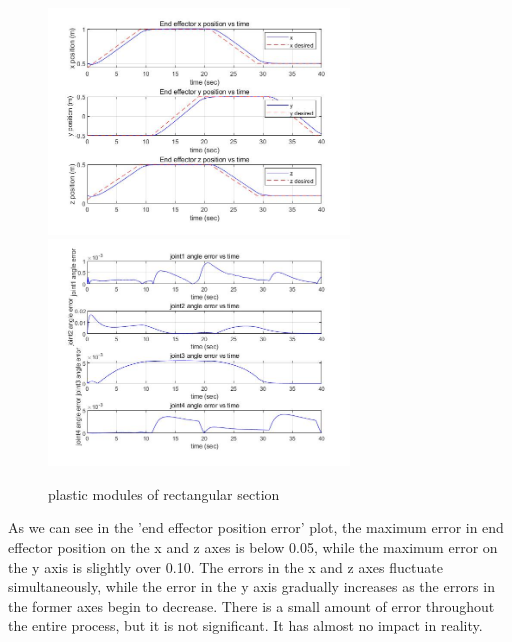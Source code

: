 \begin{figure}[htbp]
    \centering
    \includegraphics[width=8cm]{./fig/5.jpg}
    \includegraphics[width=8cm]{./fig/7.jpg}
    \caption{plastic modules of rectangular section}
    \label{f1}
\end{figure}

As we can see in the 'end effector position error' plot, the maximum error in end effector position on the x and z axes is below 0.05, while the maximum error on the y axis is slightly over 0.10. The errors in the x and z axes fluctuate simultaneously, while the error in the y axis gradually increases as the errors in the former axes begin to decrease. There is a small amount of error throughout the entire process, but it is not significant. It has almost no impact in reality.